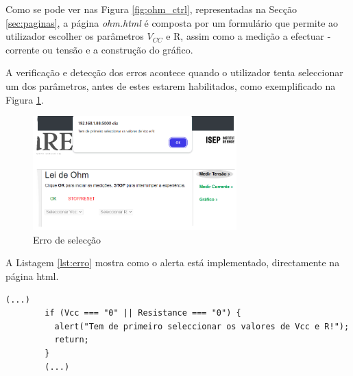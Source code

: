 


Como se pode ver nas Figura \ref{fig:ohm_ctrl}, representadas na Secção \ref{sec:paginas}, a página \textit{ohm.html} é composta por um formulário que permite ao utilizador escolher os parâmetros $V_{CC}$ e R, assim como a medição a efectuar - corrente ou tensão e a construção do gráfico.


A verificação e detecção dos erros acontece quando o utilizador tenta seleccionar um dos parâmetros, antes de estes estarem habilitados, como exemplificado na Figura \ref{fig:erropagina}. 

\begin{figure}[hbtp]
	\centering
	\includegraphics[width=0.7\textwidth]{figures/erro_pagina.png}
	\caption{Erro de selecção}
	\label{fig:erropagina}
\end{figure}

A Listagem \ref{lst:erro} mostra como o alerta está implementado, directamente na página \acrshort{html}.

\begin{center}
	\begin{minipage}{0.7\linewidth}
		\begin{lstlisting}[language=html, caption=Erro na página \textit{ohm.html}, label=lst:erro]
		(...)
        if (Vcc === "0" || Resistance === "0") {
          alert("Tem de primeiro seleccionar os valores de Vcc e R!");
          return;
        }
		(...)
	\end{lstlisting}
	\end{minipage}
\end{center}

